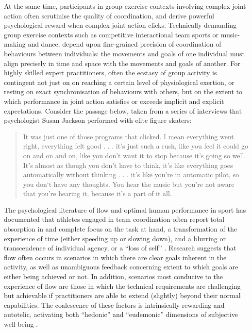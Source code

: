 \begin{CJK}{UTF8}{gbsn}
At the same time, participants in group exercise contexts involving complex joint action often scrutinise the quality of coordination, and derive powerful psychological reward when complex joint action clicks.  Technically demanding group exercise contexts such as competitive interactional team sports or music-making and dance, depend upon fine-grained precision of coordination of behaviours between individuals: the movements and goals of one individual must align precisely in time and space with the movements and goals of another.  For highly skilled expert practitioners, often the ecstasy of group activity is contingent not just on on reaching a certain level of physiological exertion, or resting on exact synchronisation of behaviours with others, but on the extent to which performance in joint action satisfies or exceeds implicit and explicit expectations.  Consider the passage below, taken from a series of interviews that psychologist Susan Jackson performed with elite figure skaters:
  \begin{quotation}
    It was just one of those programs that clicked. I mean everything went right, everything felt good . . . it's just such a rush, like you feel it could go on and on and on, like you don't want it to stop because it's going so well.  It's almost as though you don't have to think, it's like everything goes automatically without thinking . . . it's like you're in automatic pilot, so you don‘t have any thoughts.  You hear the music but you're not aware that you're hearing it, because it's a part of it all. \citep[168]{Jackson1992}.
  \end{quotation}

The psychological literature of flow and optimal human performance in sport has documented that athletes engaged in team coordination often report total absorption in and complete focus on the task at hand, a transformation of the experience of time (either speeding up or slowing down), and a blurring or transcendence of individual agency, or a ``loss of self''   \citep{Csikszentmihalyi1992,Jackson1995,Jackson1999,McNeill1995}.  Research suggests that flow often occurs in scenarios in which there are clear goals inherent in the activity, as well as unambiguous feedback concerning extent to which goals are either being achieved or not.  In addition, scenarios most conducive to the experience of flow are those in which the technical requirements are challenging but achievable if practitioners are able to extend (slightly) beyond their normal capabilities\citep{Fong2015}.  The coalescence of these factors is intrinsically rewarding and autotelic\citep{Csikszentmihalyi1975}, activating both ``hedonic'' and ``eudemonic'' dimensions of subjective well-being \citep{Huta2010,Fave2009}.


\end{CJK}
